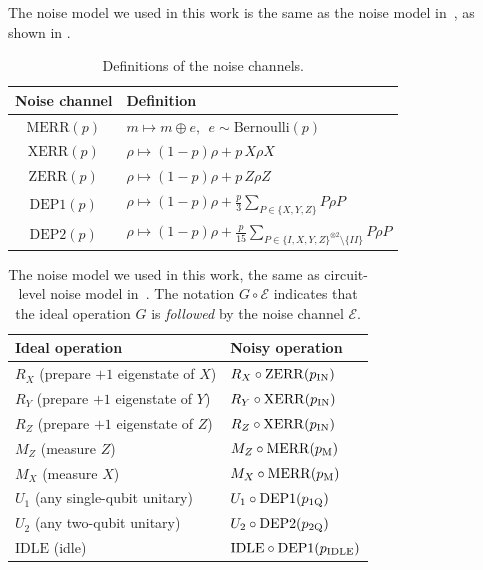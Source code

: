 The noise model we used in this work is the same as the noise model in~\cite{li_magic_2015,lao_magic_2022}, as shown in .

\begin{table}[t]
    \centering
    \begin{tabular}{c|l}
    \toprule
    \textbf{Noise channel} & \textbf{Definition} \\
    \midrule
    $\mathrm{MERR}(p)$ &
    $m \mapsto m\oplus e,\ \ e\sim \mathrm{Bernoulli}(p)$ \\
    $\mathrm{XERR}(p)$ &
    $\rho \mapsto (1-p)\rho + p\,X\rho X$ \\
    $\mathrm{ZERR}(p)$ &
    $\rho \mapsto (1-p)\rho + p\,Z\rho Z$ \\
    $\mathrm{DEP1}(p)$ &
    $\rho \mapsto (1-p)\rho + \frac{p}{3}\sum_{P\in\{X,Y,Z\}} P\rho P$ \\
    $\mathrm{DEP2}(p)$ &
    $\rho \mapsto (1-p)\rho + \frac{p}{15}\!\!\sum_{P\in\{I,X,Y,Z\}^{\otimes2}\setminus\{II\}}\!\! P\rho P$ \\
    \bottomrule
\end{tabular}
\caption{Definitions of the noise channels.}
\label{tab:li_noise_channels}
\end{table}

 
\begin{table}[t]
\centering
\renewcommand{\arraystretch}{1.2}
\begin{tabular}{l|l}
\toprule
\textbf{Ideal operation} & \textbf{Noisy operation} \\
\midrule
$R_X$ (prepare ${+}1$ eigenstate of $X$)
& $R_X \circ \mathrm{ZERR}(p_{\rm IN})$ \\
$R_Y$ (prepare ${+}1$ eigenstate of $Y$)
& $R_Y \circ \mathrm{XERR}(p_{\rm IN})$ \\
$R_Z$ (prepare ${+}1$ eigenstate of $Z$)
& $R_Z \circ \mathrm{XERR}(p_{\rm IN})$ \\
$M_Z$ (measure $Z$)
& $M_Z \circ \mathrm{MERR}(p_{\rm M})$ \\
$M_X$ (measure $X$)
& $M_X \circ \mathrm{MERR}(p_{\rm M})$ \\
$U_1$ (any single-qubit unitary)
& $U_1 \circ \mathrm{DEP1}(p_{\rm 1Q})$ \\
$U_2$ (any two-qubit unitary)
& $U_2 \circ \mathrm{DEP2}(p_{\rm 2Q})$ \\
$\text{IDLE}$ (idle)
& $\text{IDLE} \circ \mathrm{DEP1}(p_{\rm IDLE})$ \\
\bottomrule
\end{tabular}
\caption{The noise model we used in this work, the same as circuit-level noise model in~\cite{li_magic_2015,lao_magic_2022}. The notation $G \circ \mathcal{E}$ indicates that the ideal operation $G$ is \emph{followed} by the noise channel $\mathcal{E}$.}
\label{tab:li_noise_model}
\end{table}
